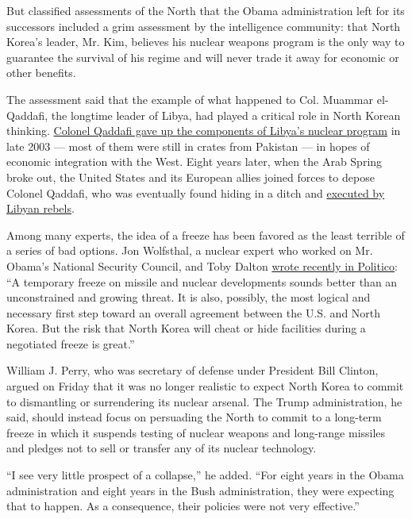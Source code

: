 But classified assessments of the North that the Obama administration
left for its successors included a grim assessment by the intelligence
community: that North Korea's leader, Mr. Kim, believes his nuclear
weapons program is the only way to guarantee the survival of his regime
and will never trade it away for economic or other benefits.

The assessment said that the example of what happened to Col. Muammar
el-Qaddafi, the longtime leader of Libya, had played a critical role in
North Korean thinking.
\href{http://www.nytimes.com/2003/12/20/world/libya-to-give-up-arms-programs-bush-announces.html}{Colonel
Qaddafi gave up the components of Libya's nuclear program} in late 2003
--- most of them were still in crates from Pakistan --- in hopes of
economic integration with the West. Eight years later, when the Arab
Spring broke out, the United States and its European allies joined
forces to depose Colonel Qaddafi, who was eventually found hiding in a
ditch and
\href{http://www.nytimes.com/2011/10/21/world/africa/qaddafi-killed-as-hometown-falls-to-libyan-rebels.html}{executed
by Libyan rebels}.

Among many experts, the idea of a freeze has been favored as the least
terrible of a series of bad options. Jon Wolfsthal, a nuclear expert who
worked on Mr. Obama's National Security Council, and Toby Dalton
\href{http://www.politico.com/magazine/story/2017/03/can-trump-stop-kim-jong-un-214910}{wrote
recently in Politico}: ``A temporary freeze on missile and nuclear
developments sounds better than an unconstrained and growing threat. It
is also, possibly, the most logical and necessary first step toward an
overall agreement between the U.S. and North Korea. But the risk that
North Korea will cheat or hide facilities during a negotiated freeze is
great.''

William J. Perry, who was secretary of defense under President Bill
Clinton, argued on Friday that it was no longer realistic to expect
North Korea to commit to dismantling or surrendering its nuclear
arsenal. The Trump administration, he said, should instead focus on
persuading the North to commit to a long-term freeze in which it
suspends testing of nuclear weapons and long-range missiles and pledges
not to sell or transfer any of its nuclear technology.

``I see very little prospect of a collapse,'' he added. ``For eight
years in the Obama administration and eight years in the Bush
administration, they were expecting that to happen. As a consequence,
their policies were not very effective.''

